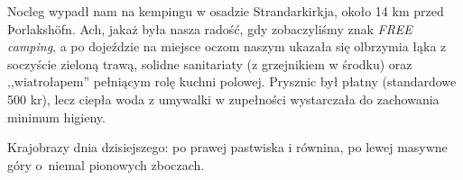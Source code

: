 
\clearpage

Nocleg wypadł nam na kempingu w osadzie Strandarkirkja, około 14 km przed Þorlakshöfn. Ach, jakaż była nasza radość, gdy zobaczyliśmy znak \emph{FREE camping}, a po dojeździe na miejsce oczom naszym ukazała się olbrzymia łąka z soczyście zieloną trawą, solidne sanitariaty (z grzejnikiem w środku) oraz ,,wiatrołapem'' pełniącym rolę kuchni polowej. Prysznic był płatny (standardowe 500 kr), lecz ciepła woda z umywalki w zupełności wystarczała do zachowania minimum higieny.

Krajobrazy dnia dzisiejszego: po prawej pastwiska i równina, po lewej masywne góry o~niemal pionowych zboczach.

